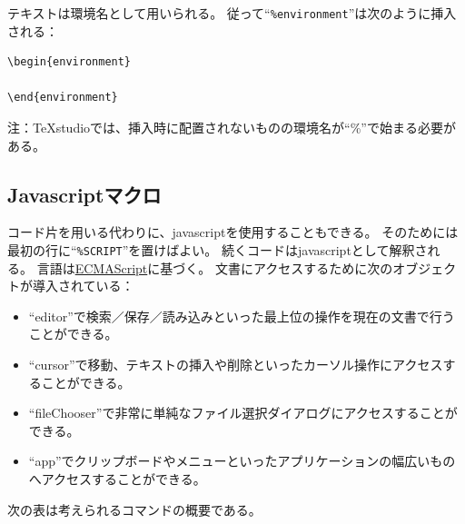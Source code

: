 テキストは環境名として用いられる。
従って``\verb+%environment+''は次のように挿入される：

\begin{lstlisting}[frame=single]
\begin{environment}

\end{environment}
\end{lstlisting}

注：TeXstudioでは、挿入時に配置されないものの環境名が``\%''で始まる必要がある。

\subsection{Javascriptマクロ}

コード片を用いる代わりに、javascriptを使用することもできる。
そのためには最初の行に``\verb+%SCRIPT+''を置けばよい。
続くコードはjavascriptとして解釈される。
言語は\href{http://www.ecmascript.org/index.php}{ECMAScript}に基づく。
文書にアクセスするために次のオブジェクトが導入されている：

\begin{itemize}
\item
  ``editor''で検索／保存／読み込みといった最上位の操作を現在の文書で行うことができる。
\item
  ``cursor''で移動、テキストの挿入や削除といったカーソル操作にアクセスすることができる。
\item
  ``fileChooser''で非常に単純なファイル選択ダイアログにアクセスすることができる。
\item
  ``app''でクリップボードやメニューといったアプリケーションの幅広いものへアクセスすることができる。
\end{itemize}

次の表は考えられるコマンドの概要である。

